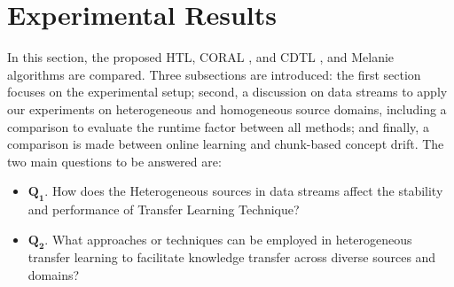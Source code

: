 
\section{Experimental Results}
\label{sec:4_5_Expsetup}

In this section, the proposed HTL, CORAL \cite{sun2016return}, and CDTL \cite{yang2021concept}, and Melanie \cite{dong2019multistream} algorithms are compared. Three subsections are introduced: the first section focuses on the experimental setup; second, a discussion on data streams to apply our experiments on heterogeneous and homogeneous source domains, including a comparison to evaluate the runtime factor between all methods; and finally, a comparison is made between online learning and chunk-based concept drift. The two main questions to be answered are:

\begin{itemize}
  \setlength{\itemindent}{-.5in}
  
  \item $\pmb{Q_1}$. How does the Heterogeneous sources in data streams affect the stability and performance of Transfer Learning Technique?
  \item $\pmb{Q_2}$. What approaches or techniques can be employed in heterogeneous transfer learning to facilitate knowledge transfer across diverse sources and domains? 
  \end{itemize}



